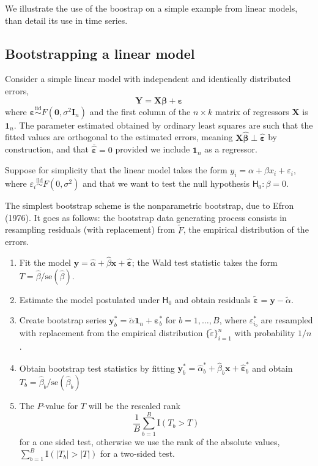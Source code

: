 \documentclass[]{book}
\providecommand{\tightlist}{%
  \setlength{\itemsep}{0pt}\setlength{\parskip}{0pt}}
\begin{document}
We illustrate the use of the boostrap on a simple example from linear models, than detail its use in time series.

\hypertarget{bootstrapping-a-linear-model}{%
\subsection{Bootstrapping a linear model}\label{bootstrapping-a-linear-model}}

Consider a simple linear model with independent and identically distributed errors, \[\boldsymbol{Y} = \mathbf{X}\boldsymbol{\beta}+\boldsymbol{\varepsilon}\] where \(\boldsymbol{\varepsilon} \stackrel{\mathrm{iid}}{\sim} F(\boldsymbol{0}, \sigma^2\mathbf{I}_n)\) and the first column of the \(n \times k\) matrix of regressors \(\mathbf{X}\) is \(\boldsymbol{1}_n\). The parameter estimated obtained by ordinary least squares are such that the fitted values are orthogonal to the estimated errors, meaning \(\mathbf{X}\hat{\boldsymbol{\beta}} \perp \hat{\boldsymbol{\varepsilon}}\) by construction, and that \(\overline{\hat{\boldsymbol{\varepsilon}}} = 0\) provided we include \(\boldsymbol{1}_n\) as a regressor.

Suppose for simplicity that the linear model takes the form \(y_i=\alpha+\beta x_i + \varepsilon_i\), where \(\varepsilon_i \stackrel{\mathrm{iid}}{\sim}F(0,\sigma^2)\) and that we want to test the null hypothesis \(\mathsf{H}_0: \beta=0\).

The simplest bootstrap scheme is the nonparametric bootstrap, due to Efron (1976). It goes as follows: the bootstrap data generating process consists in resampling residuals (with replacement) from \(\tilde{F}\), the empirical distribution of the errors.

\begin{enumerate}
\def\labelenumi{\arabic{enumi}.}
\tightlist
\item
  Fit the model \(\boldsymbol{y}=\widehat{\alpha} + \widehat{\beta}\boldsymbol{x} + \widehat{\boldsymbol{\varepsilon}}\); the Wald test statistic takes the form \(T=\hat{\beta}/\mathrm{se}(\hat{\beta})\).
\item
  Estimate the model postulated under \(\mathsf{H}_0\) and obtain residuals \(\widetilde{\boldsymbol{\varepsilon}}=\boldsymbol{y}-\widetilde{\alpha}\).
\item
  Create bootstrap series \(\boldsymbol{y}_b^* = \widetilde{\alpha}\boldsymbol{1}_n + \boldsymbol{\varepsilon}_b^*\) for \(b=1, \ldots, B\), where \(\varepsilon_{i_b}^*\) are resampled with replacement from the empirical distribution \(\{\widetilde{\varepsilon}\}_{i=1}^n\) with probability \(1/n\).
\item
  Obtain bootstrap test statistics by fitting \(\boldsymbol{y}_b^*=\widehat{\alpha}_{b}^* + \widehat{\beta}_{b}\boldsymbol{x} + \widehat{\boldsymbol{\varepsilon}}_b^*\) and obtain \(T_b=\hat{\beta}_b/\mathrm{se}(\hat{\beta}_b)\)
\item
  The \(P\)-value for \(T\) will be the rescaled rank
  \[\frac{1}{B}\sum_{b=1}^B \mathrm{I}(T_b>T)\]
  for a one sided test, otherwise we use the rank of the absolute values, \(\sum_{b=1}^B \mathrm{I}(|T_b|>|T|)\) for a two-sided test.
\end{enumerate}
\end{document}
